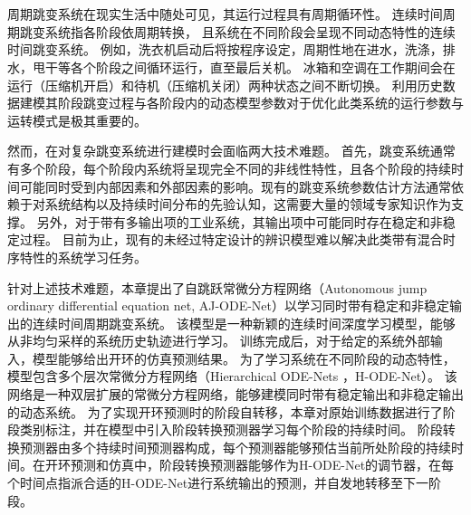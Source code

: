 
\chapter{\TitlechapterIV}
周期跳变系统在现实生活中随处可见，其运行过程具有周期循环性。
连续时间周期跳变系统指各阶段依周期转换，
且系统在不同阶段会呈现不同动态特性的连续时间跳变系统。
例如，洗衣机启动后将按程序设定，周期性地在进水，洗涤，排水，甩干等各个阶段之间循环运行，直至最后关机。
冰箱和空调在工作期间会在运行（压缩机开启）和待机（压缩机关闭）两种状态之间不断切换。
利用历史数据建模其阶段跳变过程与各阶段内的动态模型参数对于优化此类系统的运行参数与运转模式是极其重要的。

然而，在对复杂跳变系统进行建模时会面临两大技术难题。
首先，跳变系统通常有多个阶段，每个阶段内系统将呈现完全不同的非线性特性，且各个阶段的持续时间可能同时受到内部因素和外部因素的影响\cite{WANG2022111790}。现有的跳变系统参数估计方法\cite{balenzuela2022parameter}通常依赖于对系统结构以及持续时间分布的先验认知，这需要大量的领域专家知识作为支撑。
另外，对于带有多输出项的工业系统，其输出项中可能同时存在稳定和非稳定过程\cite{nason2006stationary}。
目前为止，现有的未经过特定设计的辨识模型难以解决此类带有混合时序特性的系统学习任务。

针对上述技术难题，本章提出了自跳跃常微分方程网络（Autonomous jump ordinary differential equation net, AJ-ODE-Net）以学习同时带有稳定和非稳定输出的连续时间周期跳变系统。
该模型是一种新颖的连续时间深度学习模型，能够从非均匀采样的系统历史轨迹进行学习。
训练完成后，对于给定的系统外部输入，模型能够给出开环的仿真预测结果。
为了学习系统在不同阶段的动态特性，模型包含多个层次常微分方程网络（Hierarchical ODE-Nets ，H-ODE-Net）。
该网络是一种双层扩展的常微分方程网络，能够建模同时带有稳定输出和非稳定输出的动态系统。
为了实现开环预测时的阶段自转移，本章对原始训练数据进行了阶段类别标注，并在模型中引入阶段转换预测器学习每个阶段的持续时间。
阶段转换预测器由多个持续时间预测器构成，每个预测器能够预估当前所处阶段的持续时间。在开环预测和仿真中，阶段转换预测器能够作为H-ODE-Net的调节器，在每个时间点指派合适的H-ODE-Net进行系统输出的预测，并自发地转移至下一阶段。

